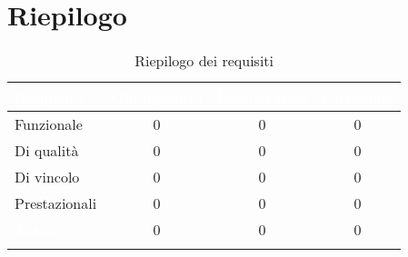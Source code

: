 \section{Riepilogo}
\begingroup
\setlength{\tabcolsep}{10pt}
\renewcommand{\arraystretch}{1.5}
\begin{xltabular}{\textwidth}{| X | c | c | c |}
    \hline
     \textbf{\textcolor{white}{Requisito}} & \textbf{\textcolor{white}{Obbligatorio}} & \textbf{\textcolor{white}{Desiderabile}} & \textbf{\textcolor{white}{Opzionale}}\\
    \hline
    \endhead
    Funzionale & 0 & 0 & 0 \\
    \hline
    Di qualità & 0 & 0 & 0 \\
    \hline
    Di vincolo & 0 & 0 & 0 \\
    \hline
    Prestazionali & 0 & 0 & 0 \\
    \hline
     \textbf{\textcolor{white}{Totale}} & 0 & 0 & 0 \\
    \hline
    
     \caption{Riepilogo dei requisiti}
    \label{tab:riepilogo}
\end{xltabular}
\endgroup

